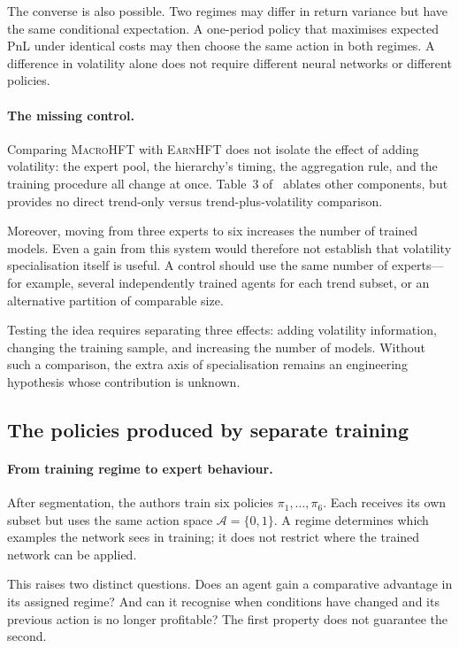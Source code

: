 \documentclass[9pt,a4paper,twocolumn]{extarticle}
\newcommand{\Macro}{\textsc{MacroHFT}}
\newcommand{\Earn}{\textsc{EarnHFT}}
\begin{document}
The converse is also possible. Two regimes may differ in return variance but have the same
conditional expectation. A one-period policy that maximises expected PnL under identical costs
may then choose the same action in both regimes. A difference in volatility alone does not
require different neural networks or different policies.

\paragraph{The missing control.}

Comparing \Macro{} with \Earn{} does not isolate the effect of adding volatility: the expert
pool, the hierarchy's timing, the aggregation rule, and the training procedure all change at
once. Table~3 of~\cite{zong2024macrohft} ablates other components, but provides no direct
trend-only versus trend-plus-volatility comparison.

Moreover, moving from three experts to six increases the number of trained models. Even a gain
from this system would therefore not establish that volatility specialisation itself is useful.
A control should use the same number of experts---for example, several independently trained
agents for each trend subset, or an alternative partition of comparable size.

Testing the idea requires separating three effects: adding volatility information, changing the
training sample, and increasing the number of models. Without such a comparison, the extra axis
of specialisation remains an engineering hypothesis whose contribution is unknown.

\subsection{The policies produced by separate training}
\label{sec:expert_specialization}

\paragraph{From training regime to expert behaviour.}

After segmentation, the authors train six policies $\pi_1,\ldots,\pi_6$. Each receives its own
subset but uses the same action space $\mathcal A=\{0,1\}$. A regime determines which examples
the network sees in training; it does not restrict where the trained network can be applied.

This raises two distinct questions. Does an agent gain a comparative advantage in its assigned
regime? And can it recognise when conditions have changed and its previous action is no longer
profitable? The first property does not guarantee the second.
\end{document}
